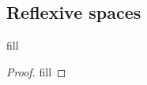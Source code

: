 \subsection{Reflexive spaces}

\begin{exercise}{1}
fill
\end{exercise}
\begin{proof}
fill
\end{proof}